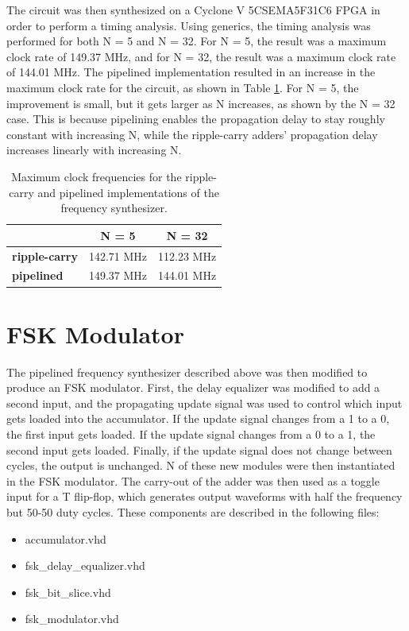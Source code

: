 \documentclass[a4paper, 10pt, titlepage]{article}
\begin{document}
The circuit was then synthesized on a Cyclone V 5CSEMA5F31C6 FPGA in order to perform a timing analysis. Using generics, the timing analysis was performed for both N = 5 and N = 32. For N = 5, the result was a maximum clock rate of 149.37 MHz, and for N = 32, the result was a maximum clock rate of 144.01 MHz. The pipelined implementation resulted in an increase in the maximum clock rate for the circuit, as shown in Table \ref{tab:fmax}. For N = 5, the improvement is small, but it gets larger as N increases, as shown by the N = 32 case. This is because pipelining enables the propagation delay to stay roughly constant with increasing N, while the ripple-carry adders' propagation delay increases linearly with increasing N.

\begin{table}[!htb]
    \centering
    \begin{tabular}[c]{ l | c | c }
        & \textbf{N = 5} & \textbf{N = 32} \\
        \hline
        \textbf{ripple-carry} & 142.71 MHz & 112.23 MHz \\
        \hline
        \textbf{pipelined} & 149.37 MHz & 144.01 MHz \\
    \end{tabular}
    \caption{Maximum clock frequencies for the ripple-carry and pipelined implementations of the frequency synthesizer.}
    \label{tab:fmax}
\end{table}

\section{FSK Modulator}

The pipelined frequency synthesizer described above was then modified to produce an FSK modulator. First, the delay equalizer was modified to add a second input, and the propagating update signal was used to control which input gets loaded into the accumulator. If the update signal changes from a 1 to a 0, the first input gets loaded. If the update signal changes from a 0 to a 1, the second input gets loaded. Finally, if the update signal does not change between cycles, the output is unchanged. N of these new modules were then instantiated in the FSK modulator. The carry-out of the adder was then used as a toggle input for a T flip-flop, which generates output waveforms with half the frequency but 50-50 duty cycles. These components are described in the following files:
\begin{itemize}
    \item accumulator.vhd
    \item fsk\_delay\_equalizer.vhd
    \item fsk\_bit\_slice.vhd
    \item fsk\_modulator.vhd
\end{itemize}
\end{document}
